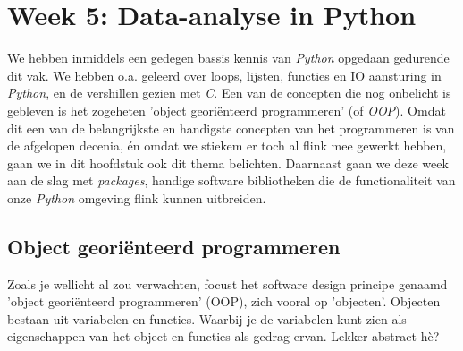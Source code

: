 \chapter{Week 5: Data-analyse in Python}

We hebben inmiddels een gedegen bassis kennis van \textit{Python} opgedaan gedurende dit vak. We hebben o.a. geleerd over loops, lijsten, functies en IO aansturing in \textit{Python}, en de vershillen gezien met \textit{C}. Een van de concepten die nog onbelicht is gebleven is het zogeheten 'object georiënteerd programmeren' (of \textit{OOP}).
Omdat dit een van de belangrijkste en handigste concepten van het programmeren is van de afgelopen decenia, én omdat we stiekem er toch al flink mee gewerkt hebben, gaan we in dit hoofdstuk ook dit thema belichten. Daarnaast gaan we deze week aan de slag met \textit{packages}, handige software bibliotheken die de functionaliteit van onze \textit{Python} omgeving flink kunnen uitbreiden. 

\section{Object georiënteerd programmeren}
Zoals je wellicht al zou verwachten, focust het software design principe genaamd 'object georiënteerd programmeren' (OOP), zich vooral op 'objecten'. Objecten bestaan uit variabelen en functies. Waarbij je de variabelen kunt zien als eigenschappen van het object en functies als gedrag ervan. Lekker abstract hè? \\


